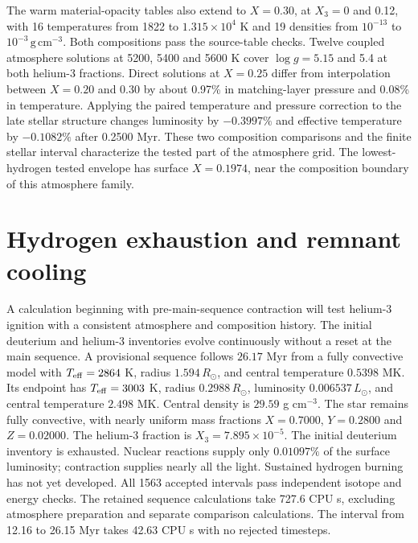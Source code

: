 \documentclass[11pt,letterpaper]{article}
\begin{document}
The warm material-opacity tables also extend to $X=0.30$, at
$X_3=0$ and 0.12, with 16 temperatures from 1822 to
$1.315\times10^4$ K and 19 densities from $10^{-13}$ to
$10^{-3}\,\mathrm{g\,cm^{-3}}$. Both compositions pass the source-table
checks. Twelve coupled atmosphere solutions at 5200, 5400 and 5600 K
cover $\log g=5.15$ and 5.4 at both helium-3 fractions. Direct solutions
at $X=0.25$ differ from interpolation between $X=0.20$ and 0.30 by
about 0.97\% in matching-layer pressure and 0.08\% in temperature.
Applying the paired temperature and pressure correction to the late stellar
structure changes luminosity by $-0.3997\%$ and effective temperature by
$-0.1082\%$ after 0.2500 Myr. These two composition comparisons and the
finite stellar interval characterize the tested part of the atmosphere grid.
The lowest-hydrogen tested envelope has surface $X=0.1974$, near the
composition boundary of this atmosphere family.

\section{Hydrogen exhaustion and remnant cooling}
A calculation beginning with pre-main-sequence contraction will test helium-3
ignition with a consistent atmosphere and composition history. The initial
deuterium and helium-3 inventories evolve continuously without a reset at the
main sequence. A provisional sequence follows $26.17$ Myr from a fully
convective model with $T_{\rm eff}=2864$ K, radius $1.594\,R_\odot$, and
central temperature $0.5398$ MK. Its endpoint has $T_{\rm eff}=3003$ K,
radius $0.2988\,R_\odot$, luminosity $0.006537\,L_\odot$, and central temperature
$2.498$ MK. Central density is $29.59$ g cm$^{-3}$. The star remains fully
convective, with nearly uniform mass fractions $X=0.7000$, $Y=0.2800$ and
$Z=0.02000$. The helium-3 fraction is $X_3=7.895\times10^{-5}$.
The initial deuterium inventory is exhausted. Nuclear reactions
supply only $0.01097\%$ of the surface luminosity; contraction supplies
nearly all the light. Sustained hydrogen burning has not yet developed.
All 1563 accepted intervals pass independent isotope and energy checks.
The retained sequence calculations take 727.6 CPU s, excluding atmosphere
preparation and separate comparison calculations. The interval from
12.16 to 26.15 Myr takes 42.63 CPU s with no rejected timesteps.
\end{document}
